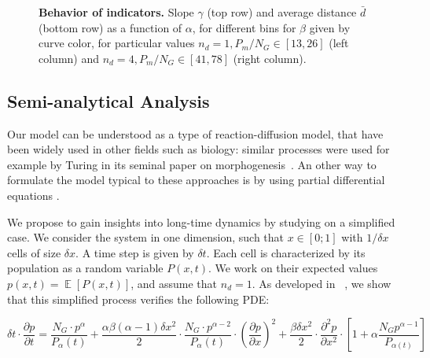\documentclass[10pt,letterpaper]{article}
\DeclareMathOperator{\E}{\mathbb{E}}
\newcommand{\Eb}[1]{\ensuremath{\E\!\left[#1\right]}}
\begin{document}
\begin{figure}
\caption{\textbf{Behavior of indicators.} Slope $\gamma$ (top row) and average distance $\bar{d}$ (bottom row) as a function of $\alpha$, for different bins for $\beta$ given by curve color, for particular values $n_d=1,P_m/N_G\in\left[13,26\right]$ (left column) and $n_d=4,P_m/N_G\in\left[41,78\right]$ (right column). }
\label{fig:fig4}
\end{figure}






\subsection*{Semi-analytical Analysis}\label{subsec:analytical}

Our model can be understood as a type of reaction-diffusion model, that have been widely used in other fields such as biology: similar processes were used for example by Turing in its seminal paper on morphogenesis~\cite{turing1952chemical}. An other way to formulate the model typical to these approaches is by using partial differential equations . 

We propose to gain insights into long-time dynamics by studying  on a simplified case. We consider the system in one dimension, such that $x\in \left[0;1\right]$ with $1/\delta x$ cells of size $\delta x$. A time step is given by $\delta t$. Each cell is characterized by its population as a random variable $P(x,t)$. We work on their expected values $p(x,t) = \Eb{P(x,t)}$, and assume that $n_d=1$. As developed in ~, we show that this simplified process verifies the following PDE:

\begin{equation}\label{eq:pde}
\delta t \cdot \frac{\partial p}{\partial t} = \frac{N_G \cdot p^{\alpha}}{P_{\alpha}(t)} + \frac{\alpha \beta (\alpha - 1) \delta x^2}{2}\cdot \frac{N_G \cdot p^{\alpha-2}}{P_{\alpha}(t)} \cdot \left(\frac{\partial p}{\partial x}\right)^2 + \frac{\beta \delta x^2}{2} \cdot \frac{\partial^2 p}{\partial x^2} \cdot\left[ 1 + \alpha \frac{N_G p^{\alpha - 1}}{P_{\alpha(t)}} \right]
\end{equation}
\end{document}
